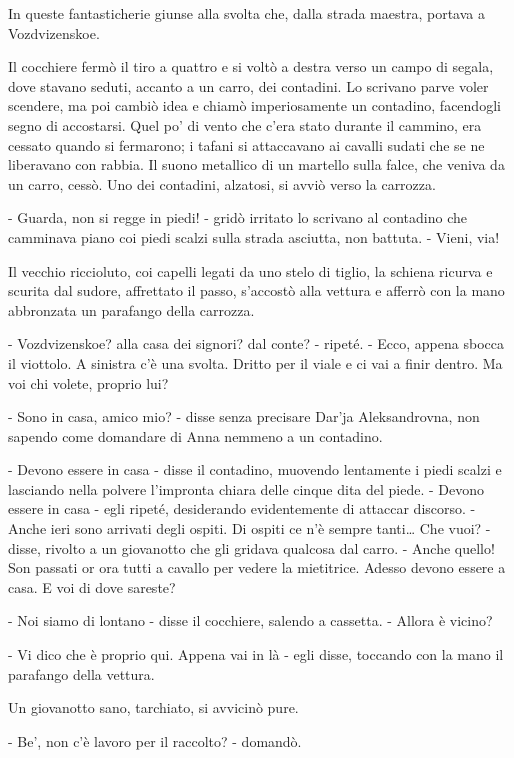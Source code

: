 In queste fantasticherie giunse alla svolta che, dalla strada maestra, portava a Vozdvizenskoe. 

Il cocchiere fermò il tiro a quattro e si voltò a destra verso un campo di segala, dove stavano seduti, accanto a un carro, dei contadini. Lo scrivano parve voler scendere, ma poi cambiò idea e chiamò imperiosamente un contadino, facendogli segno di accostarsi. Quel po' di vento che c'era stato durante il cammino, era cessato quando si fermarono; i tafani si attaccavano ai cavalli sudati che se ne liberavano con rabbia. Il suono metallico di un martello sulla falce, che veniva da un carro, cessò. Uno dei contadini, alzatosi, si avviò verso la carrozza. 

- Guarda, non si regge in piedi! - gridò irritato lo scrivano al contadino che camminava piano coi piedi scalzi sulla strada asciutta, non battuta. - Vieni, via! 

Il vecchio riccioluto, coi capelli legati da uno stelo di tiglio, la schiena ricurva e scurita dal sudore, affrettato il passo, s'accostò alla vettura e afferrò con la mano abbronzata un parafango della carrozza. 

- Vozdvizenskoe? alla casa dei signori? dal conte? - ripeté. - Ecco, appena sbocca il viottolo. A sinistra c'è una svolta. Dritto per il viale e ci vai a finir dentro. Ma voi chi volete, proprio lui? 

- Sono in casa, amico mio? - disse senza precisare Dar'ja Aleksandrovna, non sapendo come domandare di Anna nemmeno a un contadino. 

- Devono essere in casa - disse il contadino, muovendo lentamente i piedi scalzi e lasciando nella polvere l'impronta chiara delle cinque dita del piede. - Devono essere in casa - egli ripeté, desiderando evidentemente di attaccar discorso. - Anche ieri sono arrivati degli ospiti. Di ospiti ce n'è sempre tanti\ldots{} Che vuoi? - disse, rivolto a un giovanotto che gli gridava qualcosa dal carro. - Anche quello! Son passati or ora tutti a cavallo per vedere la mietitrice. Adesso devono essere a casa. E voi di dove sareste? 

- Noi siamo di lontano - disse il cocchiere, salendo a cassetta. - Allora è vicino? 

- Vi dico che è proprio qui. Appena vai in là - egli disse, toccando con la mano il parafango della vettura. 

Un giovanotto sano, tarchiato, si avvicinò pure. 

- Be', non c'è lavoro per il raccolto? - domandò. 

